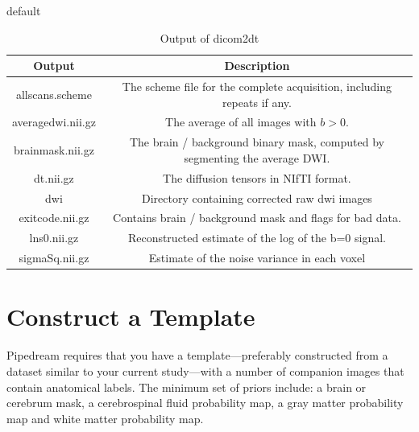 \documentclass{InsightArticle}
\begin{document}
\begin{table}[htdp]
\caption{default}
\begin{center}
\begin{tabular}{|c|c|}
\hline
\textbf{Output} & \textbf{Description} \\ \hline
allscans.scheme & The scheme file for the complete acquisition, including repeats if any. \\ \hline
averagedwi.nii.gz & The average of all images with $b > 0$. \\ \hline
brainmask.nii.gz & The brain / background binary mask, computed by segmenting the average DWI. \\ \hline
dt.nii.gz         & The diffusion tensors in NIfTI format. \\ \hline
dwi               & Directory containing corrected raw dwi images \\ \hline
exitcode.nii.gz   & Contains brain / background mask and flags for bad data. \\ \hline
lns0.nii.gz       & Reconstructed estimate of the log of the b=0 signal. \\ \hline
sigmaSq.nii.gz    & Estimate of the noise variance in each voxel \\ \hline
\end{tabular}
\end{center}
\label{dicom2dtout}
\caption{Output of dicom2dt}
\end{table}%


\section{Construct a Template}
Pipedream requires that you have a template---preferably constructed
from a dataset similar to your current study---with a number of
companion images that contain anatomical labels.  The minimum set of
priors include: a brain or cerebrum mask, a cerebrospinal fluid
probability map, a gray matter probability map and white matter
probability map.
\end{document}
